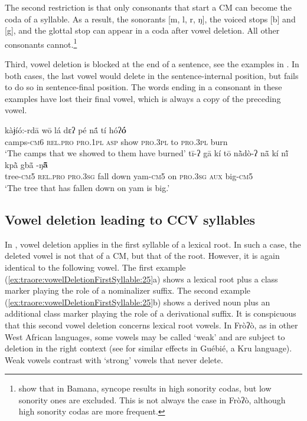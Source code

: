 \documentclass[output=paper]{langscibook}
\begin{document}
The second restriction is that only consonants that start a CM can become the coda of a syllable. As a result, the sonorants [m, l, r, ŋ], the voiced stops [b] and [g], and the glottal stop can appear in a coda after vowel deletion. All other consonants cannot.\footnote{\citet{Green2014} show that in Bamana, syncope results in high sonority codas, but low sonority ones are excluded. This is not always the case in Fròʔò, although high sonority codas are more frequent.}

Third, vowel deletion is blocked at the end of a sentence, see the examples in . In both cases, the last vowel would delete in the sentence-internal position, but fails to do so in sentence-final position. The words ending in a consonant in these examples have lost their final vowel, which is always a copy of the preceding vowel.

\begin{exe}
    \ex \label{ex:traore:vowelDeletionBlockedAtEndOfSentence:24}
    \begin{xlist}
   \ex \gll kàɉíó:-rdā  wō  lá  dɛʔ pé  nã́  tí  hóʔ\textbf{ó}\\ 
            camps-\textsc{cm}6     \textsc{rel.pro}    \textsc{pro.1pl}    \textsc{asp} show    \textsc{pro.3pl}     to    \textsc{pro.3pl}     burn\\
         \trans    ‘The camps that we showed to them have burned’ 
    \ex \gll tī-ʔ   gā  kí  tō  nã̀dò-ʔ  nã̄  kí  nĩ́  kpã̀  gbã̄ -ŋ\textbf{ã̄ }\\
              tree-\textsc{cm}5 \textsc{rel.pro}    \textsc{pro.3sg}    {fall down}  yam-\textsc{cm}5  on    \textsc{pro.3sg}   \textsc{aux}    big-\textsc{cm}5\\
              \trans `The tree that has fallen down on yam is big.'\\
\end{xlist}
\end{exe}

\subsection{ Vowel deletion leading to CCV syllables}
\label{sec:traore:vowel_deletion_ccv:3b}

In , vowel deletion applies in the first syllable of a lexical root. In such a case, the deleted vowel is not that of a CM, but that of the root. However, it is again identical to the following vowel. The first example (\ref{ex:traore:vowelDeletionFirstSyllable:25}a) shows a lexical root plus a class marker playing the role of a nominalizer suffix. The second example (\ref{ex:traore:vowelDeletionFirstSyllable:25}b) shows a derived noun plus an additional class marker playing the role of a derivational suffix. It is conspicuous that this second vowel deletion concerns lexical root vowels. In Fròʔò, as in other West African languages, some vowels may be called ‘weak’ and are subject to deletion in the right context (see \citealt{Sande2017} for similar effects in Guébié, a Kru language). Weak vowels contrast with ‘strong’ vowels that never delete.
\end{document}
